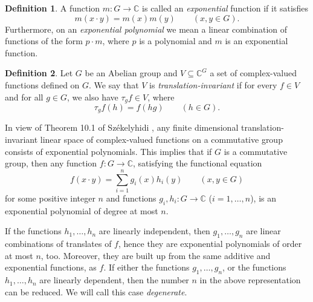 \documentclass[a4paper,12pt]{article}
\theoremstyle{plain}
\theoremstyle{definition}
\newtheorem{dfn}{Definition}
\theoremstyle{remark}
\begin{document}
\begin{dfn}
A function $m\colon G\to \mathbb{C}$ is called an \emph{exponential}
function if it satisfies
\[
 m(x\cdot y)=m(x)m(y)
 \qquad
 \left(x,y\in G\right).
\]
Furthermore, on an  \emph{exponential polynomial} we mean a linear
combination of functions of the form $p \cdot m$, where $p$ is a
polynomial and $m$ is an exponential function.
\end{dfn}



\begin{dfn}
 Let $G$ be an Abelian group and $V\subseteq \mathbb{C}^G$ a set of complex-valued functions defined on $G$. We say that $V$ is \emph{translation-invariant} if for every $f\in V$ and for all $g\in G$, we also have $\tau_{g}f\in V$,   where
 \[
  \tau_{g}f(h)= f(hg)
  \qquad
  \left(h\in G\right).
 \]
 \end{dfn}

 
 In view of Theorem 10.1 of Székelyhidi \cite{Sze91}, any finite dimensional translation-invariant linear 
 space of complex-valued functions on a commutative group consists of exponential polynomials. 
 This implies that if $G$ is a commutative group, then any function 
 $f\colon G\to \mathbb{C}$, satisfying the functional equation 
 \[
  f(x\cdot y)= \sum_{i=1}^{n}g_{i}(x)h_{i}(y) 
  \qquad 
  \left(x, y\in G\right)
 \]
for some positive integer $n$ and functions $g_{i}, h_{i}\colon G\to \mathbb{C}$ ($i=1, \ldots, n$), 
is an exponential polynomial of degree at most $n$. 

If the functions $h_{1}, \ldots, h_{n}$ are linearly independent, then $g_{1}, \ldots, g_{n}$ are linear combinations of translates of $f$, hence they are exponential polynomials of order at most $n$, too. Moreover, they are built up from the same additive and exponential functions, as $f$. If either the functions $g_{1}, \ldots, g_{n}$, or the functions $h_{1}, \ldots, h_{n}$ are linearly dependent, then the number $n$ in the above representation can be reduced. We will call this case \emph{degenerate}. 
\end{document}
